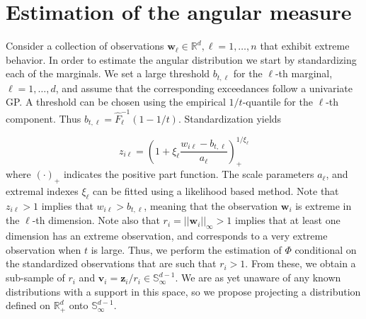 \section{Estimation of the angular measure\label{sec:methodology}}

Consider a collection of observations $\bm{w}_\ell\in {\mathbb R}^d, \ell=1, \ldots , n$ that exhibit extreme behavior. In order to estimate the angular distribution we start by standardizing each of the marginals. We set a large threshold $b_{t,\ell}$ for the $\ell$-th marginal, $\ell=1, \ldots ,d$, and assume that the corresponding exceedances follow a univariate GP. A threshold can be chosen using the empirical $1/t$-quantile for the $\ell$-th component. Thus $b_{t,\ell} = \hat{F}_\ell^{-1}(1 - 1/t)$. Standardization yields

\begin{equation}
    \label{eqn:standardization}
    z_{i\ell} = \left(1 + \xi_{\ell}\frac{w_{i\ell} - b_{t,\ell}}{a_{\ell}}\right)_{+}^{1/\xi_{\ell}}
\end{equation}
  where $(\cdot)_{+}$ indicates the positive part function. The scale parameters $a_{\ell}$, and extremal indexes $\xi_{\ell}$ can be fitted using a likelihood based method.
 Note that $z_{i\ell} > 1$ implies that $w_{i\ell} > b_{t,\ell}$, meaning that the observation
  $\bm{w}_i$ is extreme in the $\ell$-th dimension.  Note also that $r_i = ||\bm{w}_i||_\infty>1$ implies that at least one dimension has an extreme observation, and corresponds to a very extreme observation when $t$ is large. Thus, we perform the estimation of $\Phi$ conditional on the standardized observations that are such that $r_i>1$. From these, we obtain a sub-sample of $r_i$ and
  $\bm{v}_i = \bm{z}_i/r_i\in{\mathbb S}_{\infty}^{d-1}$. We are as yet unaware of any known distributions with a support
  in this space, so we propose projecting a distribution defined on ${\mathbb R}_{+}^{d}$ onto
  ${\mathbb S}_{\infty}^{d-1}$.

  

  

  
